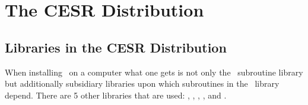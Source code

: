 \chapter{The CESR Distribution}
\label{c:distribution}

\section{Libraries in the CESR Distribution}
\label{s:libs}

When installing \bmad\ on a computer what one gets is not only the
\bmad\ subroutine library but additionally subsidiary libraries upon
which subroutines in the \bmad\ library depend. There are 5 other
libraries that are used: , ,
, , and .
